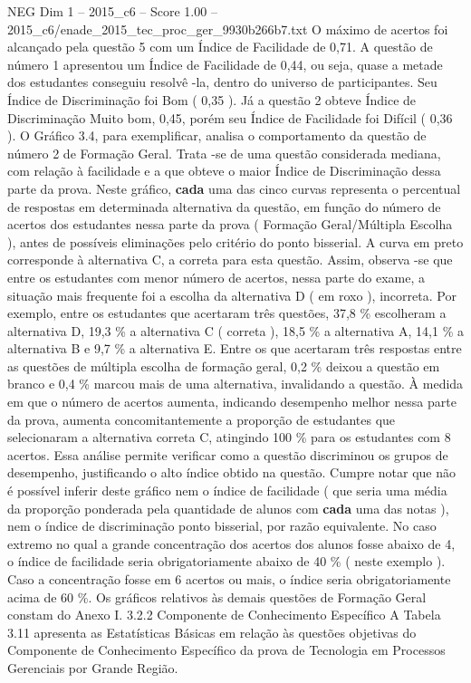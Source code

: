 \begin{textsample}{NEG Dim 1 – 2015\_c6 – Score 1.00 – 2015\_c6/enade\_2015\_tec\_proc\_ger\_9930b266b7.txt}
O máximo de acertos foi alcançado pela questão 5 com um Índice de Facilidade de 0,71.
A questão de número 1 apresentou um Índice de Facilidade de 0,44, ou seja, quase a metade dos estudantes conseguiu resolvê -la, dentro do universo de participantes.
Seu Índice de Discriminação foi Bom ( 0,35 ).
Já a questão 2 obteve Índice de Discriminação Muito bom, 0,45, porém seu Índice de Facilidade foi Difícil ( 0,36 ).
O Gráfico 3.4, para exemplificar, analisa o comportamento da questão de número 2 de Formação Geral.
Trata -se de uma questão considerada mediana, com relação à facilidade e a que obteve o maior Índice de Discriminação dessa parte da prova.
Neste gráfico, \textbf{cada} uma das cinco curvas representa o percentual de respostas em determinada alternativa da questão, em função do número de acertos dos estudantes nessa parte da prova ( Formação Geral/Múltipla Escolha ), antes de possíveis eliminações pelo critério do ponto bisserial.
A curva em preto corresponde à alternativa C, a correta para esta questão.
Assim, observa -se que entre os estudantes com menor número de acertos, nessa parte do exame, a situação mais frequente foi a escolha da alternativa D ( em roxo ), incorreta.
Por exemplo, entre os estudantes que acertaram três questões, 37,8 \% escolheram a alternativa D, 19,3 \% a alternativa C ( correta ), 18,5 \% a alternativa A, 14,1 \% a alternativa B e 9,7 \% a alternativa E.
Entre os que acertaram três respostas entre as questões de múltipla escolha de formação geral, 0,2 \% deixou a questão em branco e 0,4 \% marcou mais de uma alternativa, invalidando a questão.
À medida em que o número de acertos aumenta, indicando desempenho melhor nessa parte da prova, aumenta concomitantemente a proporção de estudantes que selecionaram a alternativa correta C, atingindo 100 \% para os estudantes com 8 acertos.
Essa análise permite verificar como a questão discriminou os grupos de desempenho, justificando o alto índice obtido na questão.
Cumpre notar que não é possível inferir deste gráfico nem o índice de facilidade ( que seria uma média da proporção ponderada pela quantidade de alunos com \textbf{cada} uma das notas ), nem o índice de discriminação ponto bisserial, por razão equivalente.
No caso extremo no qual a grande concentração dos acertos dos alunos fosse abaixo de 4, o índice de facilidade seria obrigatoriamente abaixo de 40 \% ( neste exemplo ).
Caso a concentração fosse em 6 acertos ou mais, o índice seria obrigatoriamente acima de 60 \%.
Os gráficos relativos às demais questões de Formação Geral constam do Anexo I. 3.2.2 Componente de Conhecimento Específico A Tabela 3.11 apresenta as Estatísticas Básicas em relação às questões objetivas do Componente de Conhecimento Específico da prova de Tecnologia em Processos Gerenciais por Grande Região.

\end{textsample}
